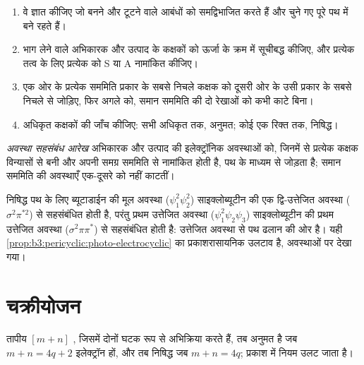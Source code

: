 \begin{method}[सहसंबंध आरेख बनाना]\label{met:b3:pericyclic:correlation-diagram}
\begin{enumerate}
  \item वे  ज्ञात कीजिए जो बनने और टूटने वाले आबंधों को समद्विभाजित करते हैं और
        चुने गए पूरे पथ में बने रहते हैं।
  \item भाग लेने वाले अभिकारक और उत्पाद के कक्षकों को ऊर्जा के
        क्रम में सूचीबद्ध कीजिए, और प्रत्येक तत्व के लिए प्रत्येक को S या A नामांकित कीजिए।
  \item एक ओर के प्रत्येक सममिति प्रकार के सबसे निचले कक्षक को दूसरी ओर के उसी प्रकार के
        सबसे निचले से जोड़िए, फिर अगले को, समान सममिति की दो रेखाओं को कभी
        काटे बिना।
  \item अधिकृत कक्षकों की जाँच कीजिए: सभी अधिकृत तक, अनुमत; कोई एक रिक्त तक,
        निषिद्ध।
\end{enumerate}
\end{method}

\begin{definition}\label{def:b3:pericyclic:state-correlation}
\emph{अवस्था सहसंबंध आरेख} अभिकारक और उत्पाद की
इलेक्ट्रॉनिक अवस्थाओं को, जिनमें से प्रत्येक कक्षक विन्यासों से बनी और
अपनी समग्र सममिति से नामांकित होती है, पथ के माध्यम से जोड़ता है; समान सममिति की
अवस्थाएँ एक-दूसरे को नहीं काटतीं।
\end{definition}

निषिद्ध  पथ के लिए ब्यूटाडाईन की मूल अवस्था ($\psi_1^2\psi_2^2$)
साइक्लोब्यूटीन की एक द्वि-उत्तेजित अवस्था ($\sigma^2\pi^{*2}$) से सहसंबंधित होती है, परंतु प्रथम उत्तेजित
अवस्था ($\psi_1^2\psi_2\psi_3$) साइक्लोब्यूटीन की प्रथम उत्तेजित अवस्था ($\sigma^2\pi\pi^*$) से सहसंबंधित होती है:
उत्तेजित अवस्था से  पथ ढलान की ओर है। यही
\cref{prop:b3:pericyclic:photo-electrocyclic} का प्रकाशरासायनिक उलटाव है, अवस्थाओं पर देखा गया।

\section{चक्रीयोजन}

\begin{theorem}[चक्रीयोजन]\label{thm:b3:pericyclic:cycloaddition}
तापीय $[m + n]$ , जिसमें दोनों घटक  रूप से अभिक्रिया करते हैं,
तब अनुमत है जब $m + n = 4q + 2$ इलेक्ट्रॉन हों, और तब निषिद्ध जब $m + n = 4q$; प्रकाश में
नियम उलट जाता है।
\end{theorem}

